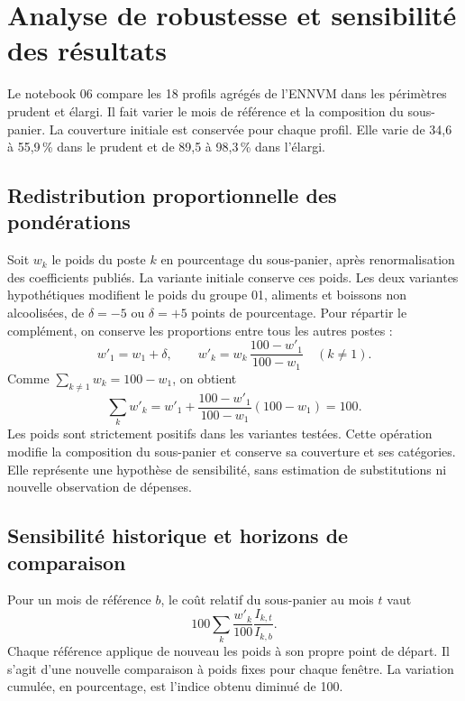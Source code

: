 \section{Analyse de robustesse et sensibilité des résultats}
\label{sec:robustesse}
Le notebook 06 compare les 18 profils agrégés de l'ENNVM dans les périmètres prudent et élargi. Il fait varier le mois de référence et la composition du sous-panier. La couverture initiale est conservée pour chaque profil. Elle varie de 34,6 à 55,9\,\% dans le prudent et de 89,5 à 98,3\,\% dans l'élargi.

\subsection{Redistribution proportionnelle des pondérations}

Soit $w_k$ le poids du poste $k$ en pourcentage du sous-panier, après renormalisation des coefficients publiés. La variante initiale conserve ces poids. Les deux variantes hypothétiques modifient le poids du groupe 01, aliments et boissons non alcoolisées, de $\delta=-5$ ou $\delta=+5$ points de pourcentage. Pour répartir le complément, on conserve les proportions entre tous les autres postes :
\[
 w'_1=w_1+\delta,\qquad
 w'_k=w_k\,\frac{100-w'_1}{100-w_1}\quad(k\ne1).
\]
Comme $\sum_{k\ne 1}w_k=100-w_1$, on obtient
\[
 \sum_k w'_k=w'_1+\frac{100-w'_1}{100-w_1}(100-w_1)=100 .
\]
Les poids sont strictement positifs dans les variantes testées. Cette opération modifie la composition du sous-panier et conserve sa couverture et ses catégories. Elle représente une hypothèse de sensibilité, sans estimation de substitutions ni nouvelle observation de dépenses.

\subsection{Sensibilité historique et horizons de comparaison}

Pour un mois de référence $b$, le coût relatif du sous-panier au mois $t$ vaut
\[
 100\sum_k \frac{w'_k}{100}\frac{I_{k,t}}{I_{k,b}}.
\]
Chaque référence applique de nouveau les poids à son propre point de départ. Il s'agit d'une nouvelle comparaison à poids fixes pour chaque fenêtre. La variation cumulée, en pourcentage, est l'indice obtenu diminué de 100.

